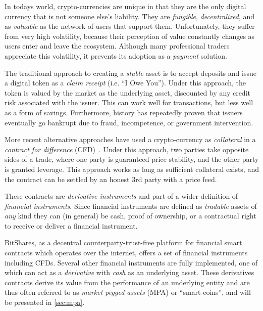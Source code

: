 In todays world, crypto-currencies are unique in that they are the only digital
currency that is not someone else's liability. They are \emph{fungible},
\emph{decentralized}, and as \emph{valuable} as the network of users that
support them. Unfortunately, they suffer from very high volatility, because
their perception of value constantly changes as users enter and leave the
ecosystem. Although many professional traders appreciate this volatility, it
prevents its adoption as a \emph{payment} solution.

The traditional approach to creating a \emph{stable} asset is to accept
deposits and issue a digital token as a \emph{claim receipt} (i.e. ``I Owe
You''). Under this approach, the token is valued by the market as the
underlying asset, discounted by any credit risk associated with the issuer.
This can work well for transactions, but less well as a form of savings.
Furthermore, history has repeatedly proven that issuers eventually go bankrupt
due to fraud, incompetence, or government intervention.

More recent alternative approaches have used a crypto-currency as
\emph{collateral} in a \emph{contract for difference} (CFD)~\cite{def:cfd}.
Under this approach, two parties take opposite sides of a trade, where one
party is guaranteed price stability, and the other party is granted leverage.
This approach works as long as sufficient collateral exists, and the contract
can be settled by an honest 3rd party with a price feed.

These contracts are \emph{derivative instruments} and part of a wider
definition of \emph{financial instruments}. Since financial instruments are
defined as \emph{tradable} assets of \emph{any} kind they can (in general) be
cash, proof of ownership, or a contractual right to receive or deliver a
financial instrument. 

BitShares, as a decentral counterparty-trust-free platform for financial smart
contracts which operates over the internet, offers a set of financial
instruments including CFDs. Several other financial instruments are fully
implemented, one of which can act as a \emph{derivative} with \emph{cash} as an
underlying asset. These derivatives contracts derive its value from the
performance of an underlying entity and are thus often referred to as
\emph{market pegged assets} (MPA) or ``smart-coins'', and will be presented in
\cref{sec:mpa}.

